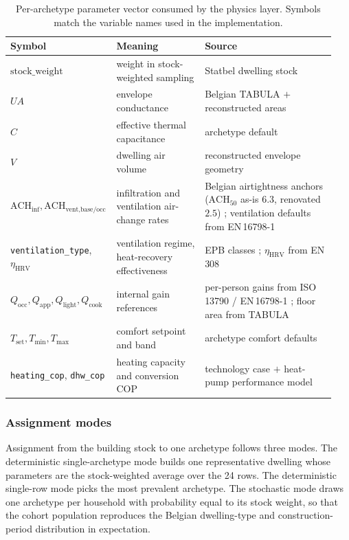 \begin{table}[ht]
  \centering
  \footnotesize
  \caption{Per-archetype parameter vector consumed by the physics
  layer. Symbols match the variable names used in the implementation.}
  \label{tab:archetype_params}
  \begin{tabular}{@{}p{0.27\linewidth} p{0.27\linewidth}
                   p{0.40\linewidth}@{}}
    \toprule
    \textbf{Symbol} & \textbf{Meaning} & \textbf{Source} \\
    \midrule
    $\text{stock\_weight}$
      & weight in stock-weighted sampling
      & Statbel dwelling stock \cite{Statbel2024Census} \\
    $UA$
      & envelope conductance
      & Belgian TABULA \cite{Cyx2011TABULABE} $+$ reconstructed areas \\
    $C$
      & effective thermal capacitance
      & archetype default \\
    $V$
      & dwelling air volume
      & reconstructed envelope geometry \\
    $\text{ACH}_{\text{inf}}, \text{ACH}_{\text{vent,base/occ}}$
      & infiltration and ventilation air-change rates
      & Belgian airtightness anchors
        ($\text{ACH}_{50}$ as-is $6.3$, renovated $2.5$)
        \cite{Cyx2011TABULABE,Hens2007Airtightness};
        ventilation defaults from EN\,16798-1
        \cite{EN16798_1_2019} \\
    \texttt{ventilation\_type}, $\eta_{\text{HRV}}$
      & ventilation regime, heat-recovery effectiveness
      & EPB classes
        \cite{VEKAEnergyPerformance,SPWEnergyPerformance};
        $\eta_{\text{HRV}}$ from EN\,308 \cite{EN308_HRV} \\
    $Q_{\text{occ}}, Q_{\text{app}}, Q_{\text{light}}, Q_{\text{cook}}$
      & internal gain references
      & per-person gains from ISO\,13790 / EN\,16798-1
        \cite{ISO13790_2008,EN16798_1_2019}; floor area from TABULA
        \cite{Cyx2011TABULABE} \\
    $T_{\text{set}}, T_{\text{min}}, T_{\text{max}}$
      & comfort setpoint and band
      & archetype comfort defaults \\
    \texttt{heating\_cop}, \texttt{dhw\_cop}
      & heating capacity and conversion COP
      & technology case $+$ heat-pump performance model \\
    \bottomrule
  \end{tabular}
\end{table}

\subsubsection*{Assignment modes}
Assignment from the building stock to one archetype follows three modes. The deterministic single-archetype mode builds one representative dwelling whose parameters are the stock-weighted average over the 24 rows. The deterministic single-row mode picks the most prevalent archetype. The stochastic mode draws one archetype per household with probability equal to its stock weight, so that the cohort population reproduces the Belgian dwelling-type and construction-period distribution in expectation.

